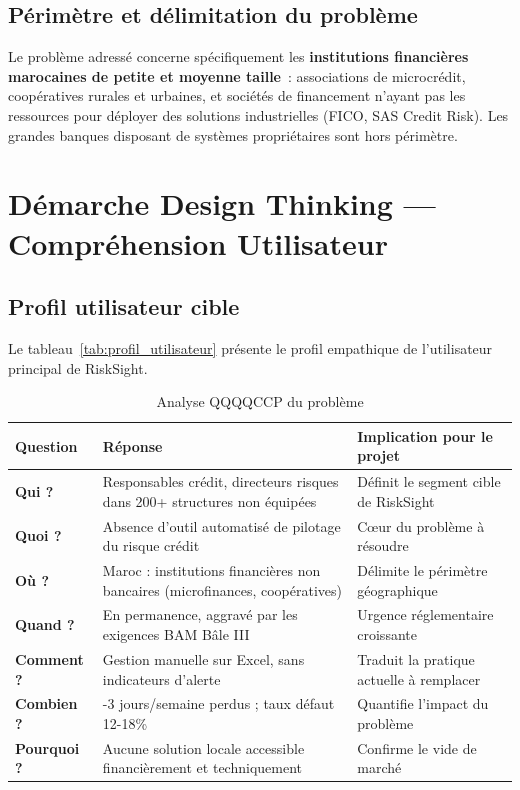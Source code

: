 \documentclass[12pt, a4paper]{report}
\begin{document}
\subsection{Périmètre et délimitation du problème}

Le problème adressé concerne spécifiquement les \textbf{institutions financières
marocaines de petite et moyenne taille}~: associations de microcrédit, coopératives
rurales et urbaines, et sociétés de financement n'ayant pas les ressources pour
déployer des solutions industrielles (FICO, SAS Credit Risk). Les grandes banques
disposant de systèmes propriétaires sont hors périmètre.

\section{Démarche Design Thinking --- Compréhension Utilisateur}

\subsection{Profil utilisateur cible}

Le tableau~\ref{tab:profil_utilisateur} présente le profil empathique de l'utilisateur
principal de RiskSight.

\begin{table}[H]
\centering
\caption{Analyse QQQQCCP du problème}
\label{tab:qqqqccp}
\renewcommand{\arraystretch}{1.5}
\setlength{\tabcolsep}{5pt}
\begin{tabularx}{\textwidth}{>{\bfseries\RaggedRight}p{2.5cm} >{\RaggedRight}X >{\RaggedRight}p{4cm}}
\toprule
\rowcolor{primary!12}
\textbf{Question} & \textbf{Réponse} & \textbf{Implication pour le projet} \\
\midrule
Qui ? & Responsables crédit, directeurs risques dans 200+ structures non équipées & Définit le segment cible de RiskSight \\
Quoi ? & Absence d'outil automatisé de pilotage du risque crédit & Cœur du problème à résoudre \\
Où ? & Maroc : institutions financières non bancaires (microfinances, coopératives) & Délimite le périmètre géographique \\
Quand ? & En permanence, aggravé par les exigences BAM Bâle III & Urgence réglementaire croissante \\
Comment ? & Gestion manuelle sur Excel, sans indicateurs d'alerte & Traduit la pratique actuelle à remplacer \\
Combien ? & 2-3 jours/semaine perdus ; taux défaut 12-18\% & Quantifie l'impact du problème \\
Pourquoi ? & Aucune solution locale accessible financièrement et techniquement & Confirme le vide de marché \\
\bottomrule
\end{tabularx}
\end{table}
\end{document}
